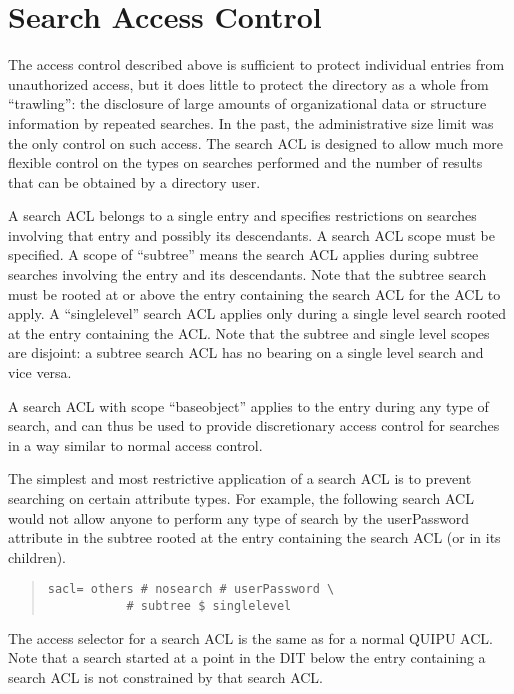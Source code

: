 \chapter{Search Access Control}
\label{disc_sacl}
  
The access control described above is sufficient to protect individual
entries from unauthorized access, but it does little to protect the
directory as a whole from ``trawling'': the disclosure of large amounts
of organizational data or structure information by repeated searches.
In the past, the administrative size limit was the only control on such
access.  The search ACL is designed to allow much more flexible control
on the types on searches performed and the number of results that can
be obtained by a directory user.

A search ACL belongs to a single entry and specifies restrictions on
searches involving that entry and possibly its descendants.  A search
ACL scope must be specified.  A scope of ``subtree'' means the search
ACL applies during subtree searches involving the entry and its
descendants.  Note that the subtree search must be rooted at or above
the entry containing the search ACL for the ACL to apply.  A
``singlelevel'' search ACL applies only during a single level search
rooted at the entry containing the ACL.  Note that the subtree and
single level scopes are disjoint:  a subtree search ACL has no bearing
on a single level search and vice versa.

A search ACL with scope ``baseobject'' applies to the entry during any
type of search, and can thus be used to provide discretionary access
control for searches in a way similar to normal access control.

The simplest and most restrictive application of a search ACL is to
prevent searching on certain attribute types.  For example, the following
search ACL would not allow anyone to perform any type of search by the
userPassword attribute in the subtree rooted at the entry containing
the search ACL (or in its children).

\begin{quote}\small\begin{verbatim}
sacl= others # nosearch # userPassword \ 
           # subtree $ singlelevel
\end{verbatim}\end{quote}

The access selector for a search ACL is the same as for a normal QUIPU
ACL.  Note that a search started at a point in the DIT below the entry
containing a search ACL is not constrained by that search ACL.

